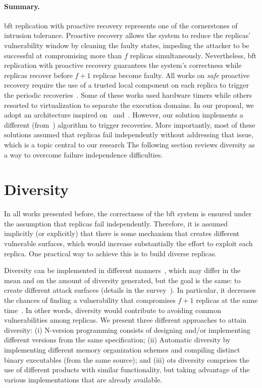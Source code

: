\paragraph{Summary.} 
\gls{bft} replication with proactive recovery represents one of the cornerstones of intrusion tolerance. 
Proactive recovery allows the system to reduce the replicas' vulnerability window by cleaning the faulty states, impeding the attacker to be successful at compromising more than $f$ replicas simultaneously. 
Nevertheless, \gls{bft} replication with proactive recovery guarantees the system's correctness while replicas recover before $f+1$ replicas become faulty. 
All works on \emph{safe} proactive recovery require the use of a trusted local component on each replica to trigger the periodic recoveries~\cite{Castro:2002,Sousa:2010,Roeder:2010,Platania:2014,Distler:2011}.
Some of these works used hardware timers while others resorted to virtualization to separate the execution domains. 
In our proposal, we adopt an architecture inspired on~\cite{Distler:2008} and~\cite{Sousa:2010}. 
However, our solution implements a different (from~\cite{Sousa:2010}) algorithm to trigger recoveries.
More importantly, most of these solutions assumed that replicas fail independently without addressing that issue, which is a topic central to our research
The following section reviews diversity as a way to overcome failure independence difficulties. 




\section{Diversity}
In all works presented before, the correctness of the \gls{bft} system is ensured under the assumption that replicas fail independently.
Therefore, it is assumed implicitly (or explicitly) that there is some mechanism that creates different vulnerable surfaces, which would increase substantially the effort to exploit each replica.
One practical way to achieve this is to build diverse replicas.

Diversity can be implemented in different manners~\cite{Deswarte:1998,Larsen:2015}, which may differ in the mean and on the amount of diversity generated, but the goal is the same: to create different attack surfaces (details in the survey~\cite{Baudry:2015}).
In particular, it decreases the chances of finding a vulnerability that compromises $f+1$ replicas at the same time~\cite{Castro:2002}.
In other words, diversity would contribute to avoiding common vulnerabilities among replicas. 
We present three different approaches to attain diversity: 
(i) N-version programming consists of designing and/or implementing  different versions from the same specification; 
(ii) Automatic diversity by implementing different memory organization schemes and compiling distinct binary executables (from the same source); 
and (iii) \gls{ots} diversity comprises the use of different products with similar functionality, but taking advantage of the various implementations that are already available.


